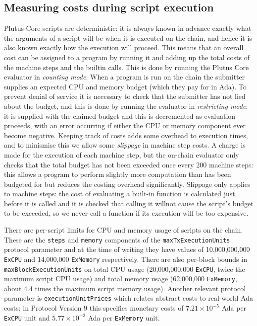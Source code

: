 \documentclass[a4paper]{article}
\begin{document}
\subsection{Measuring costs during script execution}  Plutus Core scripts
are deterministic: it is always known in advance exactly what the arguments of a
script will be when it is executed on the chain, and hence it is also known
exactly how the execution will proceed.  This means that an overall cost can be
assigned to a program by running it and adding up the total costs of the machine
steps and the builtin calls.  This is done by running the Plutus Core evaluator
in \textit{counting mode}.  When a program is run on the chain the submitter
supplies an expected CPU and memory budget (which they pay for in Ada).  To
prevent denial of service it is necessary to check that the submitter has not
lied about the budget, and this is done by running the evaluator in
\textit{restricting mode}: it is supplied with the claimed budget and this is
decremented as evaluation proceeds, with an error occurring if either the CPU or
memory component ever become negative.  Keeping track of costs adds some
overhead to execution times, and to minismise this we allow some
\textit{slippage} in machine step costs.  A charge is made for the execution of
each machine step, but the on-chain evaluator only checks that the total budget
has not been exceeded once every 200 machine steps: this allows a program to
perform slightly more computation than has been budgeted for but reduces the
costing overhead significantly.  Slippage only applies to machine steps: the
cost of evaluating a built-in function is calculated just before it is called
and it is checked that calling it willnot cause the script's budget to be
exceeded, so we never call a function if its execution will be too expensive.


There are per-script limits for CPU and memory usage of scripts on the chain.
These are the \texttt{steps} and \texttt{memory} components of the
\texttt{maxTxExecution\-Units} protocol parameter and at the time of writing
they have values of 10,000,000,000 \texttt{ExCPU} and 14,000,000
\texttt{ExMemory} respectively.  There are also per-block bounds in
\texttt{maxBlock\-Exe\-cutionUnits} on total CPU usage (20,000,000,000
\texttt{ExCPU}, twice the maximum script CPU usage) and total memory usage
(62,000,000 \texttt{ExMemory}, about 4.4 times the maximum script memory usage).
Another relevant protocol parameter is \texttt{executionUnitPrices} which
relates abstract costs to real-world Ada costs: in Protocol Version 9 this
specifies monetary costs of $7.21\times10^{-5}$ Ada per \texttt{ExCPU} unit and
$5.77\times10^{-2}$ Ada per \texttt{ExMemory} unit.
\end{document}
